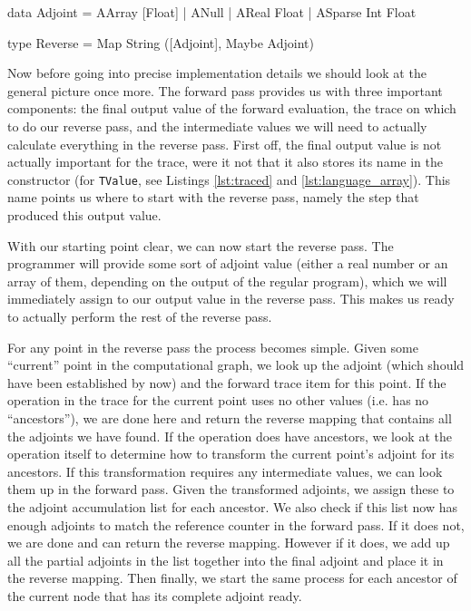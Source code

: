         \begin{haskell}[caption=Definition of the \texttt{Reverse} type, label=lst:reverse_def, gobble=12]
            data Adjoint
                = AArray  [Float]
                | ANull
                | AReal   Float
                | ASparse Int Float

            type Reverse = Map String ([Adjoint], Maybe Adjoint)
        \end{haskell}

        Now before going into precise implementation details we should look at the general picture once more.
        The forward pass provides us with three important components: the final output value of the forward evaluation, the trace on which to do our reverse pass, and the intermediate values we will need to actually calculate everything in the reverse pass.
        First off, the final output value is not actually important for the trace, were it not that it also stores its name in the constructor (for \texttt{TValue}, see Listings \ref{lst:traced} and \ref{lst:language_array}).
        This name points us where to start with the reverse pass, namely the step that produced this output value.

        With our starting point clear, we can now start the reverse pass.
        The programmer will provide some sort of adjoint value (either a real number or an array of them, depending on the output of the regular program), which we will immediately assign to our output value in the reverse pass.
        This makes us ready to actually perform the rest of the reverse pass.

        For any point in the reverse pass the process becomes simple.
        Given some ``current'' point in the computational graph, we look up the adjoint (which should have been established by now) and the forward trace item for this point.
        If the operation in the trace for the current point uses no other values (i.e. has no ``ancestors''), we are done here and return the reverse mapping that contains all the adjoints we have found.
        If the operation does have ancestors, we look at the operation itself to determine how to transform the current point's adjoint for its ancestors.
        If this transformation requires any intermediate values, we can look them up in the forward pass.
        Given the transformed adjoints, we assign these to the adjoint accumulation list for each ancestor.
        We also check if this list now has enough adjoints to match the reference counter in the forward pass.
        If it does not, we are done and can return the reverse mapping.
        However if it does, we add up all the partial adjoints in the list together into the final adjoint and place it in the reverse mapping.
        Then finally, we start the same process for each ancestor of the current node that has its complete adjoint ready.

